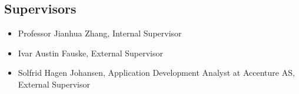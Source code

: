 \subsection{Supervisors}
\begin{itemize}
	\item[] Professor Jianhua Zhang, Internal Supervisor
	\item[] Ivar Austin Fauske, External Supervisor
	\item[] Solfrid Hagen Johansen, Application Development Analyst at Accenture AS, External Supervisor
\end{itemize}
